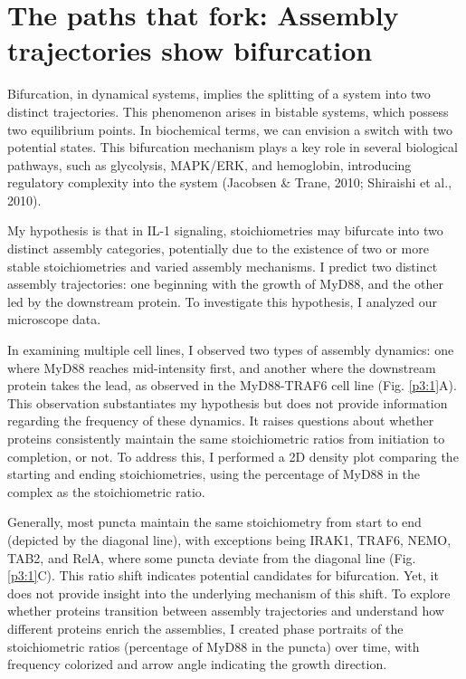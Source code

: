 \section{The paths that fork: Assembly trajectories show bifurcation}
Bifurcation, in dynamical systems, implies the splitting of a system into two distinct trajectories. This phenomenon arises in bistable systems, which possess two equilibrium points. In biochemical terms, we can envision a switch with two potential states. This bifurcation mechanism plays a key role in several biological pathways, such as glycolysis, MAPK/ERK, and hemoglobin, introducing regulatory complexity into the system (Jacobsen \& Trane, 2010; Shiraishi et al., 2010).

My hypothesis is that in IL-1 signaling, stoichiometries may bifurcate into two distinct assembly categories, potentially due to the existence of two or more stable stoichiometries and varied assembly mechanisms. I predict two distinct assembly trajectories: one beginning with the growth of MyD88, and the other led by the downstream protein. To investigate this hypothesis, I analyzed our microscope data.

In examining multiple cell lines, I observed two types of assembly dynamics: one where MyD88 reaches mid-intensity first, and another where the downstream protein takes the lead, as observed in the MyD88-TRAF6 cell line (Fig. \ref{p3:1}A). This observation substantiates my hypothesis but does not provide information regarding the frequency of these dynamics. It raises questions about whether proteins consistently maintain the same stoichiometric ratios from initiation to completion, or not. To address this, I performed a 2D density plot comparing the starting and ending stoichiometries, using the percentage of MyD88 in the complex as the stoichiometric ratio.

Generally, most puncta maintain the same stoichiometry from start to end (depicted by the diagonal line), with exceptions being IRAK1, TRAF6, NEMO, TAB2, and RelA, where some puncta deviate from the diagonal line (Fig. \ref{p3:1}C). This ratio shift indicates potential candidates for bifurcation. Yet, it does not provide insight into the underlying mechanism of this shift. To explore whether proteins transition between assembly trajectories and understand how different proteins enrich the assemblies, I created phase portraits of the stoichiometric ratios (percentage of MyD88 in the puncta) over time, with frequency colorized and arrow angle indicating the growth direction.

